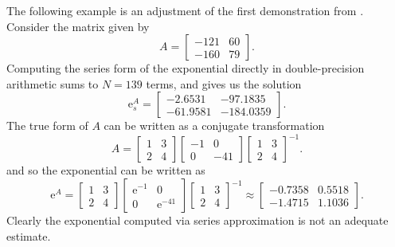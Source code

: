 The following example is an adjustment of the first demonstration from \cite{moler2003dubious}.
Consider the matrix given by
\begin{equation*}
    A = \begin{bmatrix}
        -121 & 60 \\
        -160 & 79
    \end{bmatrix}.
\end{equation*}
Computing the series form of the exponential directly in double-precision arithmetic sums to $N = 139$ terms, and gives us the solution
\begin{equation*}
    \mathrm{e}_s^A = \begin{bmatrix}
        -2.6531 & -97.1835 \\
        -61.9581 & -184.0359
    \end{bmatrix}.
\end{equation*}
The true form of $A$ can be written as a conjugate transformation
\begin{equation*}
    A = \begin{bmatrix}
        1 & 3 \\
        2 & 4
    \end{bmatrix} \begin{bmatrix}
        -1 & 0 \\
        0 & -41
    \end{bmatrix} \begin{bmatrix}
        1 & 3 \\
        2 & 4
    \end{bmatrix}^{-1}.
\end{equation*}
and so the exponential can be written as 
\begin{equation*}
    \mathrm{e}^A = \begin{bmatrix}
        1 & 3 \\
        2 & 4
    \end{bmatrix} \begin{bmatrix}
        \mathrm{e}^{-1} & 0 \\
        0 & \mathrm{e}^{-41}
    \end{bmatrix} \begin{bmatrix}
        1 & 3 \\
        2 & 4
    \end{bmatrix}^{-1} \approx \begin{bmatrix}
        -0.7358 & 0.5518 \\
        -1.4715 & 1.1036
    \end{bmatrix}.
\end{equation*}
Clearly the exponential computed via series approximation is not an adequate estimate.

